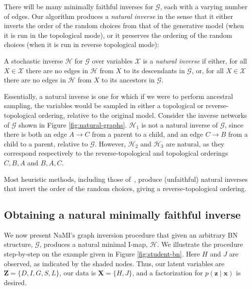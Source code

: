 There will be many minimally faithful inverses for $\mathcal{G}$, each with a varying number of edges.
Our algorithm produces a \emph{natural inverse} in the sense that it either inverts the order of the random choices from that of the generative model (when it is run in the topological mode), or it preserves the ordering  of the random choices (when it is run in reverse topological mode):
\begin{definition}\label{def:naturalness}
	A stochastic inverse $\mathcal{H}$ for $\mathcal{G}$ over variables $\mathcal{X}$ is  a \emph{natural inverse} if either, for all $X\in\mathcal{X}$ there are no edges in $\mathcal{H}$ from $X$ to its descendants in $\mathcal{G}$, or, for all $X\in\mathcal{X}$ there are no edges in $\mathcal{H}$ from $X$ to its ancestors in $\mathcal{G}$.
\end{definition}
Essentially, a natural inverse is one for which if we were to perform ancestral sampling, the variables would be sampled in either a topological or reverse-topological ordering, relative to the original model. Consider the inverse networks
of $\mathcal{G}$ shown in Figure \ref{fig:natural-graphs}. $\mathcal{H}_1$ is not a natural inverse of $\mathcal{G}$, since there is both an edge $A\rightarrow C$ from a parent to a child, and an edge $C\rightarrow B$ from a child to a parent, relative to $\mathcal{G}$. However, $\mathcal{H}_2$ and $\mathcal{H}_3$ are natural, as they correspond respectively to the reverse-topological and topological orderings $C,B,A$ and $B,A,C$.

Most heuristic methods, including those of~\citep{StuhlmullerEtAl2013,PaigeWood2016}, produce (unfaithful) natural inverses that invert the order of the random choices, giving a reverse-topological ordering.

\subsection{Obtaining a natural minimally faithful inverse}
\label{sec:true-factorization}

We now present NaMI's graph inversion procedure that given an arbitrary BN structure, $\mathcal{G}$, produces a natural minimal I-map, $\mathcal{H}$.
We illustrate the procedure step-by-step on the example given in Figure \ref{fig:student-bn}. Here $H$ and $J$ are observed, as indicated by the shaded nodes.
Thus, our latent variables are $\mathbf{Z}=\{D,I,G,S,L\}$, our data is $\mathbf{X}=\{H,J\}$, and a factorization for $p(\mathbf{z}\mid\mathbf{x})$ is desired.


